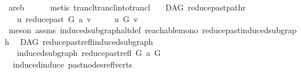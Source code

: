 \begin{isabellebody}
\ a{}{\isacharunderscore}{\kern0pt}re{\isacharunderscore}{\kern0pt}b\isanewline
\ \ \ \ \isamarkupfalse%
\ {\isacharparenleft}{\kern0pt}metis\ trancl{\isachardot}{\kern0pt}trancl{\isacharunderscore}{\kern0pt}into{\isacharunderscore}{\kern0pt}trancl{\isacharparenright}{\kern0pt}\ \isanewline
{}\isamarkupfalse%
%
\endisatagproof
{\isafoldproof}%
%
\isadelimproof
\isanewline
%
\endisadelimproof
\isanewline
\isanewline
\isanewline
{}\isamarkupfalse%
\ {\isacharparenleft}{\kern0pt}\ DAG{\isacharparenright}{\kern0pt}\ reduce{\isacharunderscore}{\kern0pt}past{\isacharunderscore}{\kern0pt}pathr{\isacharcolon}{\kern0pt}\isanewline
\ \ \ {\isachardoublequoteopen}u\ {\isasymrightarrow}\isactrlsup {\isacharasterisk}{\kern0pt}\isactrlbsub reduce{\isacharunderscore}{\kern0pt}past\ G\ a\isactrlesub \ v{\isachardoublequoteclose}\ \isanewline
\ \ \ {\isachardoublequoteopen}\ u\ {\isasymrightarrow}\isactrlsup {\isacharasterisk}{\kern0pt}\isactrlbsub G\isactrlesub \ v{\isachardoublequoteclose}\isanewline
%
\isadelimproof
\ \ %
\endisadelimproof
%
\isatagproof
{}\isamarkupfalse%
\ {\isacharparenleft}{\kern0pt}meson\ assms\ induced{\isacharunderscore}{\kern0pt}subgraph{\isacharunderscore}{\kern0pt}altdef\ reachable{\isacharunderscore}{\kern0pt}mono\ reduce{\isacharunderscore}{\kern0pt}past{\isacharunderscore}{\kern0pt}induced{\isacharunderscore}{\kern0pt}subgraph{\isacharparenright}{\kern0pt}%
\endisatagproof
{\isafoldproof}%
%
\isadelimproof
%
\endisadelimproof
%
\isadelimdocument
%
\endisadelimdocument
%
\isatagdocument
%
\isamarkuptrue%
%
\endisatagdocument
{\isafolddocument}%
%
\isadelimdocument
%
\endisadelimdocument
{}\isamarkupfalse%
\ {\isacharparenleft}{\kern0pt}\ DAG{\isacharparenright}{\kern0pt}\ reduce{\isacharunderscore}{\kern0pt}past{\isacharunderscore}{\kern0pt}refl{\isacharunderscore}{\kern0pt}induced{\isacharunderscore}{\kern0pt}subgraph{\isacharcolon}{\kern0pt}\isanewline
\ \ \ {\isachardoublequoteopen}induced{\isacharunderscore}{\kern0pt}subgraph\ {\isacharparenleft}{\kern0pt}reduce{\isacharunderscore}{\kern0pt}past{\isacharunderscore}{\kern0pt}refl\ G\ a{\isacharparenright}{\kern0pt}\ G{\isachardoublequoteclose}\isanewline
%
\isadelimproof
\ \ %
\endisadelimproof
%
\isatagproof
{}\isamarkupfalse%
\ \ induced{\isacharunderscore}{\kern0pt}induce\ past{\isacharunderscore}{\kern0pt}nodes{\isacharunderscore}{\kern0pt}refl{\isacharunderscore}{\kern0pt}verts\ \isamarkupfalse%

\end{isabellebody}
